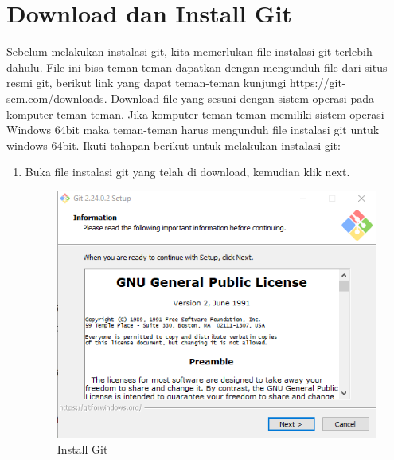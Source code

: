 \section{Download dan Install Git}
Sebelum melakukan instalasi git, kita memerlukan file instalasi git terlebih dahulu. File ini bisa teman-teman dapatkan dengan mengunduh file dari situs resmi git, berikut link yang dapat teman-teman kunjungi https://git-scm.com/downloads. Download file yang sesuai dengan sistem operasi pada komputer teman-teman. Jika komputer teman-teman memiliki sistem operasi Windows 64bit maka teman-teman harus mengunduh file instalasi git untuk windows 64bit. Ikuti tahapan berikut untuk melakukan instalasi git:
\begin{enumerate}
\item Buka file instalasi git yang telah di download, kemudian klik next.
\begin{figure}[H]
\centering
\includegraphics[scale=.5]{figures/install_git1}
\caption{Install Git}
\label{install_git1}
\end{figure}


\end{enumerate}
